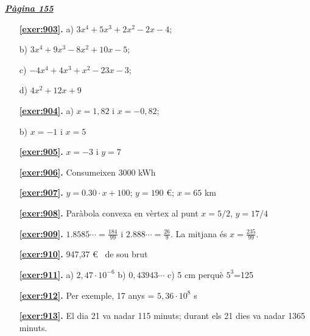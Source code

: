 
\hyperlink{page.155}{\textbf{\em Pàgina 155}}
\begin{enumerate}
\item[\fontfamily{phv}\selectfont\color{blue}\textbf{\ref{exer:903}. }] \label{ans:903} 
 a) $3x^4+5x^3+2x^2-2x-4$; \par b) $3x^4+9x^3-8x^2+10x-5$; \par c) $-4x^4+4x^3+x^2-23x-3$; \par d) $4x^2+12x+9$
 \end{enumerate}
\begin{enumerate}
\item[\fontfamily{phv}\selectfont\color{blue}\textbf{\ref{exer:904}. }] \label{ans:904} 
 a) $x=1,82$ i $x=-0,82$; \par b) $x=-1$ i $x=5$
\item[\fontfamily{phv}\selectfont\color{blue}\textbf{\ref{exer:905}. }] \label{ans:905} 
 $x=-3$ i $y=7$
\item[\fontfamily{phv}\selectfont\color{blue}\textbf{\ref{exer:906}. }] \label{ans:906} 
 Consumeixen $3000$ kWh
\item[\fontfamily{phv}\selectfont\color{blue}\textbf{\ref{exer:907}. }] \label{ans:907} 
 $y=0.30 \cdot x + 100$; \quad $y=190$ €; \quad $x=65$ km
\item[\fontfamily{phv}\selectfont\color{blue}\textbf{\ref{exer:908}. }] \label{ans:908} 
 Paràbola convexa en vèrtex al punt $x=5/2$, $y=17/4$
\item[\fontfamily{phv}\selectfont\color{blue}\textbf{\ref{exer:909}. }] \label{ans:909} 
 $1.8585\cdots = \frac {184}{99}$ i $2.888 \cdots = \frac {26}{9}$. La mitjana és $x=\frac {235}{99}$. 
\item[\fontfamily{phv}\selectfont\color{blue}\textbf{\ref{exer:910}. }] \label{ans:910} 
 947,37 \euro {} \ de sou brut
\item[\fontfamily{phv}\selectfont\color{blue}\textbf{\ref{exer:911}. }] \label{ans:911} 
 a) $2,47\cdot 10^{-6}$ \quad b) $0,43943\cdots $ \quad c) 5 cm perquè $5^{3}$=125
\item[\fontfamily{phv}\selectfont\color{blue}\textbf{\ref{exer:912}. }] \label{ans:912} 
 Per exemple, 17 anys = $5,36\cdot 10^{8}$ s
\item[\fontfamily{phv}\selectfont\color{blue}\textbf{\ref{exer:913}. }] \label{ans:913} 
El dia 21 va nadar 115 minuts; durant els 21 dies va nadar 1365 minuts.
 \end{enumerate}
\vspace{0.3cm}

